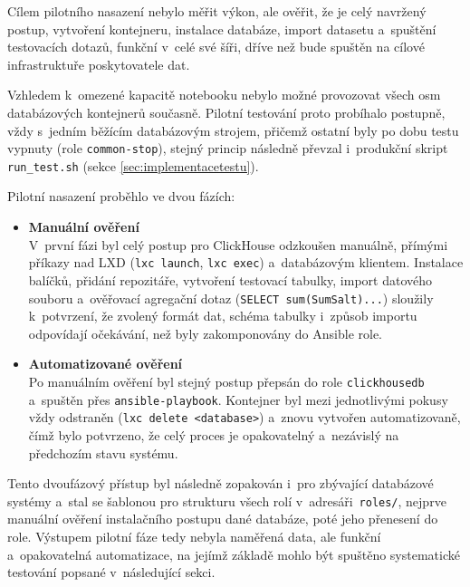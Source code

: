 Cílem pilotního nasazení nebylo měřit výkon, ale ověřit, že je celý navržený postup, vytvoření kontejneru, instalace databáze, import datasetu a~spuštění testovacích dotazů, funkční v~celé své šíři, dříve než bude spuštěn na cílové infrastruktuře poskytovatele dat.

Vzhledem k~omezené kapacitě notebooku nebylo možné provozovat všech osm databázových kontejnerů současně. 
Pilotní testování proto probíhalo postupně, vždy s~jedním běžícím databázovým strojem, přičemž ostatní byly po dobu testu vypnuty (role \texttt{common-stop}), stejný princip následně převzal i~produkční skript \texttt{run\_test.sh} (sekce \ref{sec:implementacetestu}).

Pilotní nasazení proběhlo ve dvou fázích:
\begin{itemize}
    \item \textbf{Manuální ověření} \\
    V~první fázi byl celý postup pro ClickHouse odzkoušen manuálně, přímými příkazy nad LXD (\texttt{lxc launch}, \texttt{lxc exec}) a~databázovým klientem. 
    Instalace balíčků, přidání repozitáře, vytvoření testovací tabulky, import datového souboru a~ověřovací agregační dotaz (\texttt{SELECT sum(SumSalt)...}) sloužily k~potvrzení, že zvolený formát dat, schéma tabulky i~způsob importu odpovídají očekávání, než byly zakomponovány do Ansible role.
    
    \item \textbf{Automatizované ověření} \\
    Po manuálním ověření byl stejný postup přepsán do role \texttt{clickhousedb} a~spuštěn přes \texttt{ansible-playbook}. 
    Kontejner byl mezi jednotlivými pokusy vždy odstraněn (\texttt{lxc delete <database>}) a~znovu vytvořen automatizovaně, čímž bylo potvrzeno, že celý proces je opakovatelný a~nezávislý na předchozím stavu systému.
\end{itemize}

Tento dvoufázový přístup byl následně zopakován i~pro zbývající databázové systémy a~stal se šablonou pro strukturu všech rolí v~adresáři~\texttt{roles/}, nejprve manuální ověření instalačního postupu dané databáze, poté jeho přenesení do role. 
Výstupem pilotní fáze tedy nebyla naměřená data, ale funkční a~opakovatelná automatizace, na jejímž základě mohlo být spuštěno systematické testování popsané v~následující sekci.
\clearpage
